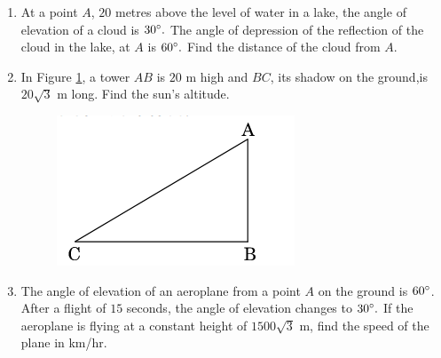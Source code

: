 \begin{enumerate}
\item At a point $A$, $20$ metres above the level of water in a lake, the angle of elevation of a cloud is $30 \degree.$ The angle of depression of the reflection of the cloud in the lake, at $A$ is $60\degree .$ Find the distance of the cloud from $A$.
\item In Figure \ref{Figure 1}, a tower $AB$ is $20$ m high and $BC$, its shadow on the ground,is $20\sqrt{3}$ m long. Find the sun's altitude.
\begin{figure}[h!]
	\centering
    \includegraphics[width=\columnwidth]{figs/cbse_30_3_1.png}
	\label{Figure 1}
\end{figure}
\item The angle of elevation of an aeroplane from a point $A$ on the ground is $60 \degree  $. After a flight of $15$ seconds, the angle of elevation changes to $  30 \degree.$ If the aeroplane is flying at a constant height of $1500\sqrt{3}$ m, find the speed of the plane in km/hr.
\end{enumerate}
